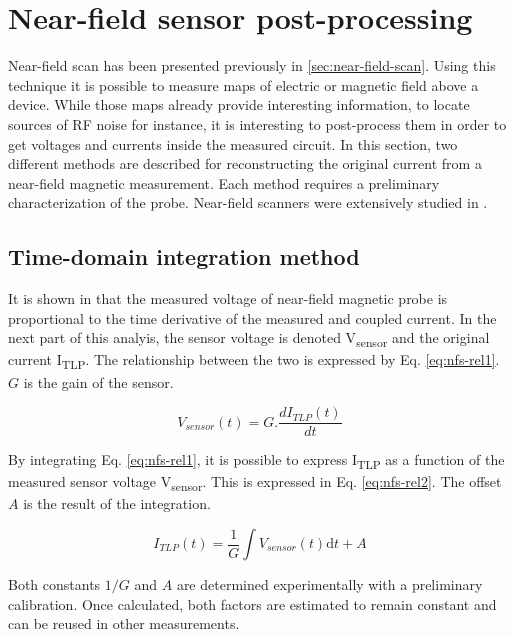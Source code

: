 \section{Near-field sensor post-processing}
\label{sec:on-chip-near-field-process}

Near-field scan has been presented previously in \ref{sec:near-field-scan}.
Using this technique it is possible to measure maps of electric or magnetic field above a device.
While those maps already provide interesting information, to locate sources of RF noise for instance, it is interesting to post-process them in order to get voltages and currents inside the measured circuit.
In this section, two different methods are described for reconstructing the original current from a near-field magnetic measurement.
Each method requires a preliminary characterization of the probe.
Near-field scanners were extensively studied in \cite{near-field-scan, phd-monnereau}.

\subsection{Time-domain integration method}

It is shown in \cite{near-field-scan} that the measured voltage of near-field magnetic probe is proportional to the time derivative of the measured and coupled current.
In the next part of this analyis, the sensor voltage is denoted V\textsubscript{sensor} and the original current I\textsubscript{TLP}.
The relationship between the two is expressed by Eq. \ref{eq:nfs-rel1}.
$G$ is the gain of the sensor.

\begin{equation}
V_{sensor}(t) = G.\frac{dI_{TLP}(t)}{dt}
\label{eq:nfs-rel1}
\end{equation}

By integrating Eq. \ref{eq:nfs-rel1}, it is possible to express I\textsubscript{TLP} as a function of the measured sensor voltage V\textsubscript{sensor}.
This is expressed in Eq. \ref{eq:nfs-rel2}.
The offset $A$ is the result of the integration.

\begin{equation}
I_{TLP}(t) = \frac{1}{G}\int V_{sensor}(t) \mathrm{d}t + A
\label{eq:nfs-rel2}
\end{equation}

Both constants $1/G$ and $A$ are determined experimentally with a preliminary calibration.
Once calculated, both factors are estimated to remain constant and can be reused in other measurements.

